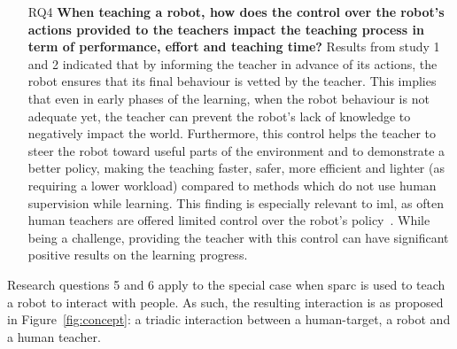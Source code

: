 \begin{itemize}
	\item [RQ4] \textbf{When teaching a robot, how does the control over the robot's actions provided to the teachers impact the teaching process in term of performance, effort and teaching time?} 
	Results from study 1 and 2 indicated that by informing the teacher in advance of its actions, the robot ensures that its final behaviour is vetted by the teacher. This implies that even in early phases of the learning, when the robot behaviour is not adequate yet, the teacher can prevent the robot's lack of knowledge to negatively impact the world. Furthermore, this control helps the teacher to steer the robot toward useful parts of the environment and to demonstrate a better policy, making the teaching faster, safer, more efficient and lighter (as requiring a lower workload) compared to methods which do not use human supervision while learning. This finding is especially relevant to \gls{iml}, as often human teachers are offered limited control over the robot's policy~\citep{thomaz2008teachable,knox2009interactively}. While being a challenge, providing the teacher with this control can have significant positive results on the learning progress.
\end{itemize}

Research questions 5 and 6 apply to the special case when \gls{sparc} is used to teach a robot to interact with people. As such, the resulting interaction is as proposed in Figure~\ref{fig:concept}: a triadic interaction between a human-target, a robot and a human teacher.

